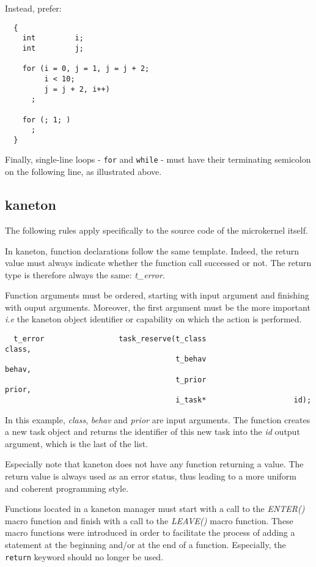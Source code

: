 Instead, prefer:

\begin{verbatim}
  {
    int         i;
    int         j;

    for (i = 0, j = 1, j = j + 2;
         i < 10;
         j = j + 2, i++)
      ;

    for (; 1; )
      ;
  }
\end{verbatim}

Finally, single-line loops - \texttt{for} and \texttt{while} - must have
their terminating semicolon on the following line, as illustrated above.

%
%

\subsection{kaneton}

The following rules apply specifically to the source code of the microkernel
itself.

In kaneton, function declarations follow the same template. Indeed, the
return value must always indicate whether the function call successed or not.
The return type is therefore always the same: \textit{t\_error}.

Function arguments must be ordered, starting with input argument and
finishing with ouput arguments. Moreover, the first argument must
be the more important \textit{i.e} the kaneton object identifier or
capability on which the action is performed.

\begin{verbatim}
  t_error                 task_reserve(t_class                    class,
                                       t_behav                    behav,
                                       t_prior                    prior,
                                       i_task*                    id);
\end{verbatim}

In this example, \textit{class}, \textit{behav} and \textit{prior} are
input arguments. The function creates a new task object and returns the
identifier of this new task into the \textit{id} output argument, which
is the last of the list.

Especially note that kaneton does not have any function returning a value.
The return value is always used as an error status, thus leading to a more
uniform and coherent programming style.

Functions located in a kaneton manager must start with a call to the
\textit{ENTER()} macro function and finish with a call to the \textit{LEAVE()}
macro function. These macro functions were introduced in order to
facilitate the process of adding a statement at the beginning and/or at
the end of a function. Especially, the \texttt{return} keyword should no
longer be used.

